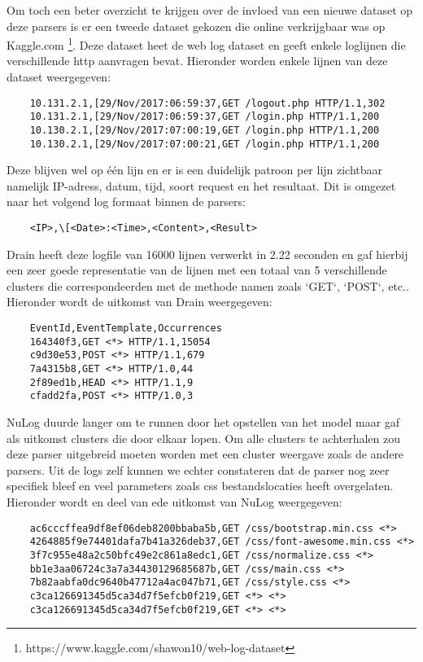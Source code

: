 Om toch een beter overzicht te krijgen over de invloed van een nieuwe dataset op deze parsers is er een tweede dataset gekozen die online verkrijgbaar was op Kaggle.com \footnote{https://www.kaggle.com/shawon10/web-log-dataset}. Deze dataset heet de web log dataset en geeft enkele loglijnen die verschillende http aanvragen bevat. Hieronder worden enkele lijnen van deze dataset weergegeven:
\begin{verbatim}
    10.131.2.1,[29/Nov/2017:06:59:37,GET /logout.php HTTP/1.1,302
    10.131.2.1,[29/Nov/2017:06:59:37,GET /login.php HTTP/1.1,200
    10.130.2.1,[29/Nov/2017:07:00:19,GET /login.php HTTP/1.1,200
    10.130.2.1,[29/Nov/2017:07:00:21,GET /login.php HTTP/1.1,200
\end{verbatim}
Deze blijven wel op één lijn en er is een duidelijk patroon per lijn zichtbaar namelijk IP-adress, datum, tijd, soort request en het resultaat. Dit is omgezet naar het volgend log formaat binnen de parsers:
\begin{verbatim}
    <IP>,\[<Date>:<Time>,<Content>,<Result>
\end{verbatim}

Drain heeft deze logfile van 16000 lijnen verwerkt in 2.22 seconden en gaf hierbij een zeer goede representatie van de lijnen met een totaal van 5 verschillende clusters die correspondeerden met de methode namen zoals `GET`, `POST`, etc.. Hieronder wordt de uitkomst van Drain weergegeven:
\begin{verbatim}
    EventId,EventTemplate,Occurrences
    164340f3,GET <*> HTTP/1.1,15054
    c9d30e53,POST <*> HTTP/1.1,679
    7a4315b8,GET <*> HTTP/1.0,44
    2f89ed1b,HEAD <*> HTTP/1.1,9
    cfadd2fa,POST <*> HTTP/1.0,3
\end{verbatim}

NuLog duurde langer om te runnen door het opstellen van het model maar gaf als uitkomst clusters die door elkaar lopen. Om alle clusters te achterhalen zou deze parser uitgebreid moeten worden met een cluster weergave zoals de andere parsers. Uit de logs zelf kunnen we echter constateren dat de parser nog zeer specifiek bleef en veel parameters zoals css bestandslocaties heeft overgelaten. Hieronder wordt en deel van ede uitkomst van NuLog weergegeven:
\begin{verbatim}
    ac6cccffea9df8ef06deb8200bbaba5b,GET /css/bootstrap.min.css <*>
    4264885f9e74401dafa7b41a326deb37,GET /css/font-awesome.min.css <*>
    3f7c955e48a2c50bfc49e2c861a8edc1,GET /css/normalize.css <*>
    bb1e3aa06724c3a7a34430129685687b,GET /css/main.css <*>
    7b82aabfa0dc9640b47712a4ac047b71,GET /css/style.css <*>
    c3ca126691345d5ca34d7f5efcb0f219,GET <*> <*>
    c3ca126691345d5ca34d7f5efcb0f219,GET <*> <*>
\end{verbatim}

